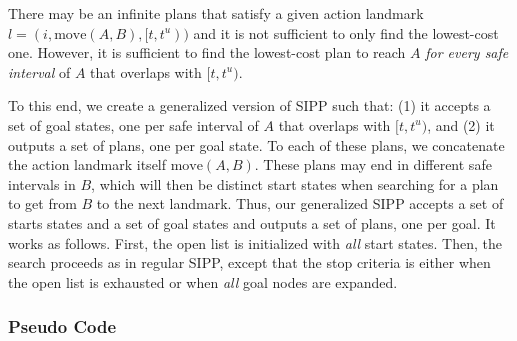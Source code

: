 \documentclass[letterpaper]{article} %
\newcommand{\ccbs}{\ac{CCBS}\xspace}
\newcommand{\ccbsds}{\ac{CCBS-DS}\xspace}
\newcommand{\sipp}{\ac{SIPP}\xspace}
\begin{document}
 There may be an infinite plans that satisfy a given action landmark $l=(i, \text{move}(A,B), [t,t^u))$ and it is not sufficient to only find the lowest-cost one.
 However, it is sufficient to find the lowest-cost plan to reach $A$ \emph{for every safe interval} of $A$ that overlaps with $[t,t^u)$.


 To this end, we create a generalized version of \sipp such that:
 (1)  it accepts a set of goal states, one per safe interval of $A$ that overlaps with $[t,t^u)$,
 and (2) it outputs a set of plans, one per goal state.
 To each of these plans, we concatenate the  action landmark itself $\text{move}(A,B)$.
 These plans may end in different safe intervals in $B$, which will then be distinct start states when searching for a plan to get from $B$ to the next landmark.
Thus, our generalized \sipp accepts a set of starts states and a set of goal states and outputs a set of plans, one per goal.
It works as follows.
First, the open list is initialized with
\emph{all} start states.
Then, the search proceeds as in regular \sipp, except that the stop criteria is either when the open list is exhausted or when \emph{all} goal nodes are expanded.




\subsubsection{Pseudo Code}
\end{document}
